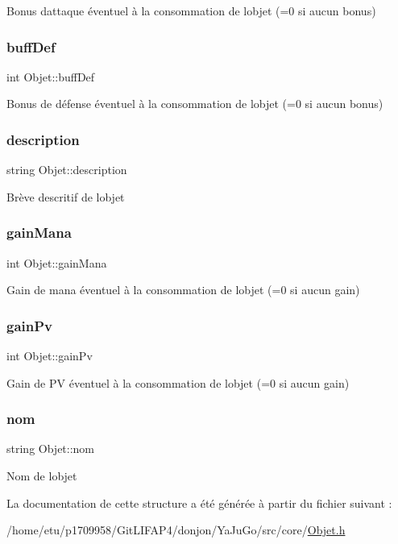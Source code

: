 Bonus d\textquotesingle{}attaque éventuel à la consommation de l\textquotesingle{}objet (=0 si aucun bonus) \mbox{\label{structObjet_a42d2bd62696101046a02f87eeacb47c6}} 
\subsubsection{\texorpdfstring{buff\+Def}{buffDef}}
{\footnotesize\ttfamily int Objet\+::buff\+Def}

Bonus de défense éventuel à la consommation de l\textquotesingle{}objet (=0 si aucun bonus) \mbox{\label{structObjet_a859a7cc06454b94c97137f972f558f2d}} 
\subsubsection{\texorpdfstring{description}{description}}
{\footnotesize\ttfamily string Objet\+::description}

Brève descritif de l\textquotesingle{}objet \mbox{\label{structObjet_addb6bc5586e8d753634d6af2996555ae}} 
\subsubsection{\texorpdfstring{gain\+Mana}{gainMana}}
{\footnotesize\ttfamily int Objet\+::gain\+Mana}

Gain de mana éventuel à la consommation de l\textquotesingle{}objet (=0 si aucun gain) \mbox{\label{structObjet_a90b37eae967b944035f8572e08f10a07}} 
\subsubsection{\texorpdfstring{gain\+Pv}{gainPv}}
{\footnotesize\ttfamily int Objet\+::gain\+Pv}

Gain de PV éventuel à la consommation de l\textquotesingle{}objet (=0 si aucun gain) \mbox{\label{structObjet_a9e83b65144a3f7121a5042c70a5e41db}} 
\subsubsection{\texorpdfstring{nom}{nom}}
{\footnotesize\ttfamily string Objet\+::nom}

Nom de l\textquotesingle{}objet 

La documentation de cette structure a été générée à partir du fichier suivant \+:\begin{DoxyCompactItemize}
\item 
/home/etu/p1709958/\+Git\+L\+I\+F\+A\+P4/donjon/\+Ya\+Ju\+Go/src/core/\mbox{\hyperlink{Objet_8h}{Objet.\+h}}\end{DoxyCompactItemize}
